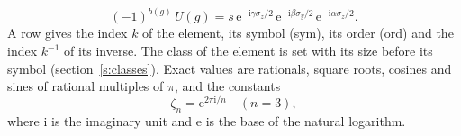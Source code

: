 \documentclass[10pt,a4paper]{article}
\numberwithin{equation}{section}
\newcommand{\iunit}{\mathrm{i}}
\newcommand{\expe}{\mathrm{e}}
\newcommand{\rootunity}[1]{\zeta_{#1}}
\newcommand{\pauli}[1]{\sigma_{#1}}
\begin{document}
\begin{equation}\label{e:euler}(-1)^{b(g)}\,U(g) = s\,\expe^{-\iunit\gamma\pauli{z}/2}\,\expe^{-\iunit\beta\pauli{y}/2}\,\expe^{-\iunit\alpha\pauli{z}/2}.\end{equation}
\leavevmode\label{n:index.element.inverse}\label{n:head.sym}\label{n:head.ord}A row gives the index $k$ of the element, its symbol (sym), its order (ord) and the index $k^{-1}$ of its inverse. \label{n:head.class}The class of the element is set with its size before its symbol (section~\ref{s:classes}).
\leavevmode\label{n:constant.root}\label{n:index.root.order}Exact values are rationals, square roots, cosines and sines of rational multiples of $\pi$, and the constants
\begin{equation}\label{e:constants}\rootunity{n} = \expe^{2\pi\iunit/n}\quad(n = 3),\end{equation}
where $\iunit$ is the imaginary unit and $\expe$ is the base of the natural logarithm.
\end{document}

